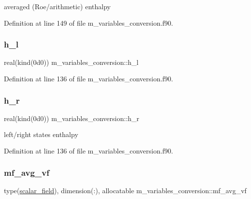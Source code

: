 averaged (Roe/arithmetic) enthalpy 



Definition at line 149 of file m\+\_\+variables\+\_\+conversion.\+f90.

\mbox{\label{namespacem__variables__conversion_a7f9d10004d2efcf06092c8e83afd90a9}} 
\subsubsection{\texorpdfstring{h\+\_\+l}{h\_l}}
{\footnotesize\ttfamily real(kind(0d0)) m\+\_\+variables\+\_\+conversion\+::h\+\_\+l}



Definition at line 136 of file m\+\_\+variables\+\_\+conversion.\+f90.

\mbox{\label{namespacem__variables__conversion_a00d96d7b614a5c0ce7dbe96d556b0342}} 
\subsubsection{\texorpdfstring{h\+\_\+r}{h\_r}}
{\footnotesize\ttfamily real(kind(0d0)) m\+\_\+variables\+\_\+conversion\+::h\+\_\+r}



left/right states enthalpy 



Definition at line 136 of file m\+\_\+variables\+\_\+conversion.\+f90.

\mbox{\label{namespacem__variables__conversion_a9ca8440ed6e591b63ef1466c6b46ce5d}} 
\subsubsection{\texorpdfstring{mf\+\_\+avg\+\_\+vf}{mf\_avg\_vf}}
{\footnotesize\ttfamily type(\hyperlink{structm__derived__types_1_1scalar__field}{scalar\+\_\+field}), dimension(\+:), allocatable m\+\_\+variables\+\_\+conversion\+::mf\+\_\+avg\+\_\+vf}



